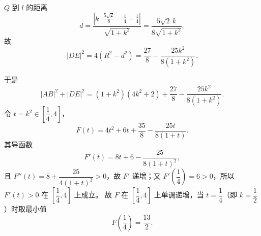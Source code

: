 \begin{answer}
$Q$ 到 $l$ 的距离
\nopagebreak[4]
\[d=\frac{\left|k\cdot\frac{5\sqrt2}8-\frac14+\frac14\right|}{\sqrt{1+k^2}}=\frac{5\sqrt2\,k}{8\sqrt{1+k^2}},\]
故
\nopagebreak[4]
\[|DE|^2=4(R^2-d^2)=\frac{27}8-\frac{25k^2}{8(1+k^2)}.\]

于是
\nopagebreak[4]
\[|AB|^2+|DE|^2=(1+k^2)(4k^2+2)+\frac{27}8-\frac{25k^2}{8(1+k^2)}.\]
令 $t=k^2\in\left[\dfrac14,4\right]$，
\nopagebreak[4]
\[F(t)=4t^2+6t+\frac{35}8-\frac{25t}{8(1+t)}.\]
其导函数
\nopagebreak[4]
\[F'(t)=8t+6-\frac{25}{8(1+t)^2},\]
且 $F''(t)=8+\dfrac{25}{4(1+t)^3}>0$，故 $F'$ 递增；又 $F'\left(\dfrac14\right)=6>0$，所以 $F'(t)>0$ 在 $\left[\dfrac14,4\right]$ 上成立。
故 $F$ 在 $\left[\dfrac14,4\right]$ 上单调递增，当 $t=\dfrac14$（即 $k=\dfrac12$）时取最小值
\nopagebreak[4]
\[F\left(\frac14\right)=\frac{13}2.\]




\end{answer}
